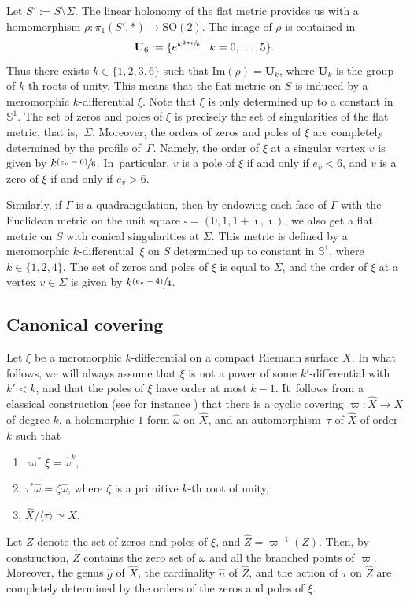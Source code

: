 \documentclass[10pt]{amsart}
\newenvironment{enumeratea}
{\bgroup\def\theenumi{\alph{enumi}}\begin{enumerate}}
{\end{enumerate}\egroup}
\newcommand{\psfrac}[2]{\sfrac{(#1)}{#2}}
\theoremstyle{plain}
\theoremstyle{definition}
\renewcommand{\S}{\mathbb{S}}
\newcommand{\Ub}{\mathbf{U}}
\let\Sig\Sigma
\let\G\Gamma
\begin{document}
Let $S':=S\setminus\Sigma$. The linear holonomy of the flat metric provides us with a homomorphism $\rho: \pi_1(S',*) \to \mathrm{SO}(2)$.
The image of $\rho$ is contained in
\[
\Ub_6:=\{e^{k\sfrac{2\pi\imath}{6}}\mid k=0,\dots,5\}.
\]
Thus there exists $k\in \{1,2,3,6\}$ such that $\mathrm{Im}(\rho)=\Ub_k$, where $\Ub_k$ is the group of $k$-th roots of unity.
This means that the flat metric on $S$ is induced by a meromorphic $k$-differential $\xi$.
Note that $\xi$ is only determined up to a constant in $\S^1$.
The set of zeros and poles of $\xi$ is precisely the set of singularities of the flat metric, that is,~$\Sigma$.
Moreover, the orders of zeros and poles of $\xi$ are completely determined by the profile of~$\G$.
Namely, the order of $\xi$ at a singular vertex $v$ is given by $k\psfrac{e_v-6}{6}$.
In~particular, $v$ is a pole of $\xi$ if and only if $e_v<6$, and $v$ is a zero of $\xi$ if and only if $e_v>6$.

Similarly, if $\G$ is a quadrangulation, then by endowing each face of $\G$ with the Euclidean metric on the unit square $\square=(0,1,1+\imath,\imath)$, we also get a flat metric on $S$ with conical singularities at $\Sig$. This metric is defined by a meromorphic $k$-differential~$\xi$ on $S$ determined up to constant in $\S^1$, where $k\in \{1,2,4\}$. The set of zeros and poles of $\xi$ is equal to $\Sigma$, and the order of $\xi$ at a vertex $v\in \Sigma$ is given by $k\psfrac{e_v-4}{4}$.

\subsection{Canonical covering}\label{sec:can:cov:kdiff}
Let $\xi$ be a meromorphic $k$-differential on a compact Riemann surface $X$. In what follows, we will always assume that $\xi$ is not a power of some $k'$-differential with $k'<k$, and that the poles of $\xi$ have order at most $k-1$. It~follows from a classical construction (see for instance \cite{EV92, BCGGM:kdiff, Ngu19}) that there is a cyclic covering $\varpi: \hat{X}\to X$ of degree $k$, a holomorphic $1$-form $\hat{\omega}$ on $\hat{X}$, and an automorphism~$\tau$ of $\hat{X}$ of order $k$ such that
\begin{enumeratea}
\item\label{enum:a}
$\varpi^*\xi=\hat{\omega}^k$,
\item\label{enum:b}
$\tau^*\hat{\omega}=\zeta\hat{\omega}$, where $\zeta$ is a primitive $k$-th root of unity,
\item\label{enum:c}
$\hat{X}/\langle \tau \rangle \simeq X$.
\end{enumeratea}
Let $Z$ denote the set of zeros and poles of $\xi$, and $\hat{Z}=\varpi^{-1}(Z)$. Then, by construction, $\hat{Z}$ contains the zero set of $\omega$ and all the branched points of $\varpi$.
Moreover, the genus $\hat{g}$ of $\hat{X}$, the cardinality $\hat{n}$ of $\hat{Z}$, and the action of $\tau$ on $\hat{Z}$ are completely determined by the orders of the zeros and poles of $\xi$.
\end{document}
